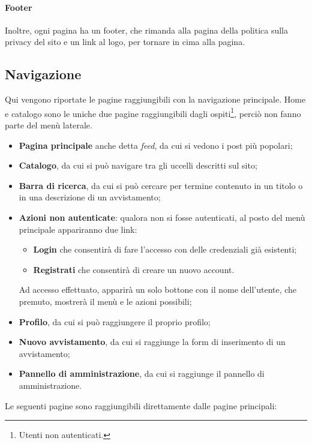 \documentclass[12pt, a4paper]{article}
\begin{document}
    \paragraph{Footer}
    Inoltre, ogni pagina ha un footer, che rimanda alla pagina della politica sulla privacy del sito e un link al logo, per tornare in cima alla pagina.

    \subsection{Navigazione}
    Qui vengono riportate le pagine raggiungibili con la navigazione principale. Home e catalogo sono le uniche due pagine raggiungibili dagli ospiti\footnote{Utenti non autenticati.}, perciò non fanno parte del menù laterale.
    \begin{itemize}
        \item \textbf{Pagina principale} anche detta \textit{feed}, da cui si vedono i post più popolari;
        \item \textbf{Catalogo}, da cui si può navigare tra gli uccelli descritti sul sito;
        \item \textbf{Barra di ricerca}, da cui si può cercare per termine contenuto in un titolo o in una descrizione di un avvistamento;
        \item \textbf{Azioni non autenticate}: qualora non si fosse autenticati, al posto del menù principale appariranno due link:
        \begin{itemize}
            \item \textbf{Login} che consentirà di fare l'accesso con delle credenziali già esistenti;
            \item \textbf{Registrati} che consentirà di creare un nuovo account.
        \end{itemize}
        Ad accesso effettuato, apparirà un solo bottone con il nome dell'utente, che premuto, mostrerà il menù e le azioni possibili;
        \item \textbf{Profilo}, da cui si può raggiungere il proprio profilo;
        \item \textbf{Nuovo avvistamento}, da cui si raggiunge la form di inserimento di un avvistamento;
        \item \textbf{Pannello di amministrazione}, da cui si raggiunge il pannello di amministrazione.
    \end{itemize}
    Le seguenti pagine sono raggiungibili direttamente dalle pagine principali:
\end{document}
